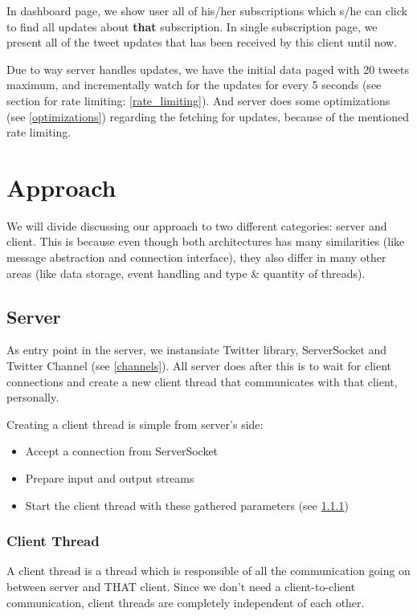 \documentclass{article}
\begin{document}
\par In dashboard page, we show user all of his/her subscriptions which s/he can click to find all updates about \textbf{that} subscription. In single subscription page, we present all of the tweet updates that has been received by this client until now.

\par Due to way server handles updates, we have the initial data paged with 20 tweets maximum, and incrementally watch for the updates for every 5 seconds (see section for rate limiting: \ref{rate_limiting}). And server does some optimizations (see \ref{optimizations}) regarding the fetching for updates, because of the mentioned rate limiting.

\newpage

\section{Approach}
We will divide discussing our approach to two different categories: server and client. This is because even though both architectures has many similarities (like message abstraction and connection interface), they also differ in many other areas (like data storage, event handling and type \& quantity of threads).

\subsection{Server}
As entry point in the server, we instansiate Twitter library, ServerSocket and Twitter Channel (see \ref{channels}). All server does after this is to wait for client connections and create a new client thread that communicates with that client, personally.

Creating a client thread is simple from server's side:
\begin{itemize}
  \item Accept a connection from ServerSocket
  \item Prepare input and output streams
  \item Start the client thread with these gathered parameters (see \ref{client_thread})
\end{itemize}

\subsubsection{Client Thread}
\label{client_thread}
\par A client thread is a thread which is responsible of all the communication going on between server and THAT client. Since we don't need a client-to-client communication, client threads are completely independent of each other.
\end{document}
